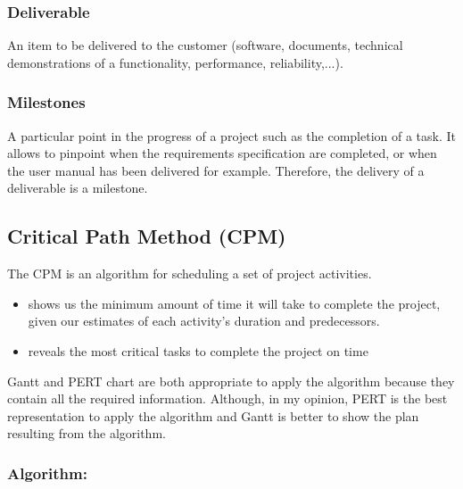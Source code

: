 \subsubsection{Deliverable}
An item to be delivered to the customer (software, documents, technical demonstrations of a functionality, performance, reliability,...).

\subsubsection{Milestones}
A particular point in the progress of a project such as the completion of a task. It allows to pinpoint when the requirements specification are completed, or when the user manual has been delivered for example. Therefore, the delivery of a deliverable is a milestone.


\subsection{Critical Path Method (CPM)}

The CPM is an algorithm for scheduling a set of project activities.
\begin{itemize}
    \item shows us the minimum amount of time it will take to
        complete the project, given our estimates of each activity’s duration
        and predecessors.
    \item reveals the most critical tasks to complete
        the project on time
\end{itemize}


Gantt and PERT chart are both appropriate to apply the algorithm because they contain all the
required information. Although, in my opinion, PERT is the best representation to apply the
algorithm and Gantt is better to show the plan resulting from the algorithm.

\subsubsection{Algorithm:}

